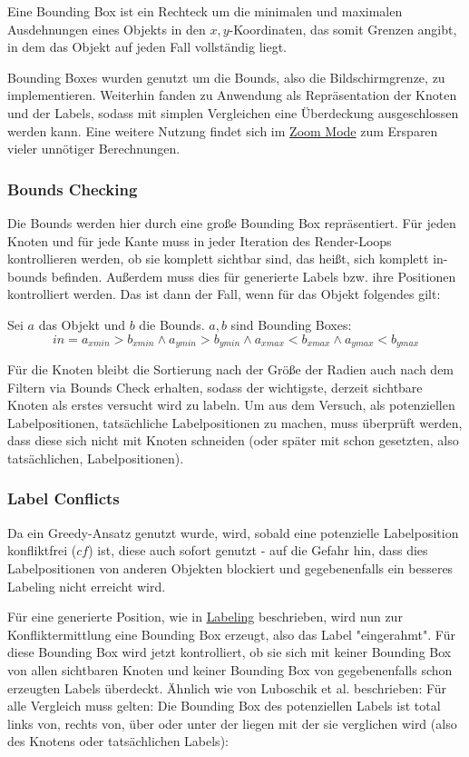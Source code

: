 
Eine Bounding Box ist ein Rechteck um die minimalen und maximalen Ausdehnungen eines Objekts in den $x,y$-Koordinaten,
das somit Grenzen angibt, in dem das Objekt auf jeden Fall vollständig liegt.

Bounding Boxes wurden genutzt um die Bounds, also die Bildschirmgrenze, zu implementieren.
Weiterhin fanden zu Anwendung als Repräsentation der Knoten und der Labels, sodass mit simplen Vergleichen
eine Überdeckung ausgeschlossen werden kann.
Eine weitere Nutzung findet sich im \hyperref[subsec:zoom]{Zoom Mode} zum Ersparen vieler unnötiger Berechnungen.

\subsubsection{Bounds Checking}
Die Bounds werden hier durch eine große Bounding Box repräsentiert.
Für jeden Knoten und für jede Kante muss in jeder Iteration des
Render-Loops kontrollieren werden, ob sie komplett sichtbar sind, das heißt, sich komplett in-bounds befinden.
Außerdem muss dies für generierte Labels bzw. ihre Positionen kontrolliert werden.
Das ist dann der Fall, wenn für das Objekt folgendes gilt:

Sei $a$ das Objekt und $b$ die Bounds. $a,b$ sind Bounding Boxes:
$$    in = a_{xmin} > b_{xmin} \wedge a_{ymin} > b_{ymin} \wedge a_{xmax} < b_{xmax} \wedge a_{ymax} < b_{ymax} $$


Für die Knoten bleibt die Sortierung nach der Größe der Radien auch nach dem Filtern via Bounds Check erhalten,
sodass der wichtigste, derzeit sichtbare Knoten als erstes versucht wird zu labeln.
Um aus dem Versuch, als potenziellen Labelpositionen, tatsächliche Labelpositionen zu machen, muss überprüft werden,
dass diese sich nicht mit Knoten schneiden (oder später mit schon gesetzten, also tatsächlichen, Labelpositionen).

\subsubsection{Label Conflicts}
\label{subsubsec:label_conflict}
Da ein Greedy-Ansatz genutzt wurde, wird, sobald eine potenzielle Labelposition konfliktfrei ($cf$) ist, diese auch sofort genutzt -
auf die Gefahr hin, dass dies Labelpositionen von anderen Objekten blockiert und gegebenenfalls ein besseres Labeling nicht erreicht wird.

Für eine generierte Position, wie in \hyperref[sec:labeling]{Labeling} beschrieben, wird nun zur Konfliktermittlung eine Bounding Box erzeugt, also das Label "eingerahmt".
Für diese Bounding Box wird jetzt kontrolliert, ob sie sich mit keiner Bounding Box von allen sichtbaren Knoten und keiner Bounding Box von gegebenenfalls schon erzeugten Labels überdeckt.
Ähnlich wie von Luboschik et al.\cite{main} beschrieben: Für alle Vergleich muss gelten: Die Bounding Box des potenziellen Labels ist total links von, rechts von, über oder unter der liegen mit der sie verglichen wird (also des Knotens oder tatsächlichen Labels):

